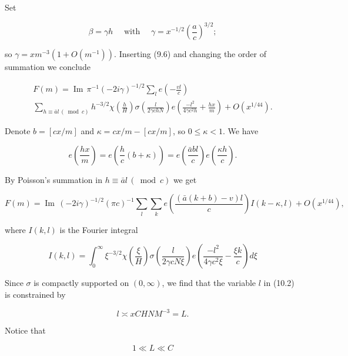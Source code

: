 \documentclass[10pt]{article}
\begin{document}
Set


\begin{equation*}
\beta=\gamma h \quad \text { with } \quad \gamma=x^{-1 / 2}\left(\frac{a}{c}\right)^{3 / 2} ; \tag{10.1}
\end{equation*}


so $\gamma=x m^{-3}\left(1+O\left(m^{-1}\right)\right)$. Inserting (9.6) and changing the order of summation we conclude

$$
\begin{gathered}
F(m)=\operatorname{Im}\,\pi^{-1}(-2 i \gamma)^{-1 / 2} \sum_{l} e\left(-\frac{v l}{c}\right) \\
\sum_{h\equiv\bar a l\, (\bmod c)} h^{-3 / 2} \chi\left(\frac{h}{H}\right) \sigma\left(\frac{l}{2 \gamma c h N}\right) e\left(\frac{-l^{2}}{4 \gamma c^{2} h}+\frac{h x}{m}\right)+O\left(x^{1 / 44}\right) .
\end{gathered}
$$

Denote $b=[c x / m]$ and $\kappa=c x / m-[c x / m]$, so $0 \leqslant \kappa<1$. We have

$$
e\left(\frac{h x}{m}\right)=e\left(\frac{h}{c}(b+\kappa)\right)=e\left(\frac{\bar{a} b l}{c}\right) e\left(\frac{\kappa h}{c}\right) .
$$

By Poisson's summation in $h \equiv \bar{a} l\, (\bmod c)$ we get


\begin{equation*}
F(m)=\operatorname{Im}\,(-2i\gamma)^{-1 / 2}(\pi c)^{-1} \sum_{l} \sum_{k} e\left(\frac{(\bar{a}(k+b)-v) l}{c}\right) I(k-\kappa, l)+O\left(x^{1 / 44}\right), \tag{10.2}
\end{equation*}


where $I(k, l)$ is the Fourier integral

$$
I(k, l)=\int_{0}^{\infty} \xi^{-3 / 2} \chi\left(\frac{\xi}{H}\right) \sigma\left(\frac{l}{2 \gamma c N \xi}\right) e\left(\frac{-l^{2}}{4 \gamma c^{2} \xi}-\frac{\xi k}{c}\right) d \xi
$$

Since $\sigma$ is compactly supported on $(0, \infty)$, we find that the variable $l$ in (10.2) is constrained by


\begin{equation*}
l \asymp x C H N M^{-3}=L . \tag{10.3}
\end{equation*}


Notice that


\begin{equation*}
1 \ll L \ll C \tag{10.4}
\end{equation*}
\end{document}
